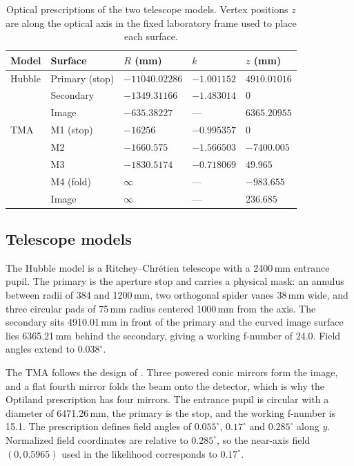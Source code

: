 \begin{table}
\centering
\caption{Optical prescriptions of the two telescope models. Vertex positions $z$ are along the optical axis in the fixed laboratory frame used to place each surface.}
\label{tab:prescriptions}
\begin{tabular}{lllll}
\hline
Model & Surface & $R$ (mm) & $k$ & $z$ (mm) \\
\hline
Hubble & Primary (stop) & $-11040.02286$ & $-1.001152$ & $4910.01016$ \\
       & Secondary      & $-1349.31166$  & $-1.483014$ & $0$ \\
       & Image          & $-635.38227$   & ---         & $6365.20955$ \\
\hline
TMA    & M1 (stop)      & $-16256$       & $-0.995357$ & $0$ \\
       & M2             & $-1660.575$    & $-1.566503$ & $-7400.005$ \\
       & M3             & $-1830.5174$   & $-0.718069$ & $49.965$ \\
       & M4 (fold)      & $\infty$       & ---         & $-983.655$ \\
       & Image          & $\infty$       & ---         & $236.685$ \\
\hline
\end{tabular}
\end{table}

\subsection{Telescope models}
The Hubble model is a Ritchey--Chr{\'e}tien telescope with a 2400\,mm entrance pupil. The primary is the aperture stop and carries a physical mask: an annulus between radii of 384 and 1200\,mm, two orthogonal spider vanes 38\,mm wide, and three circular pads of 75\,mm radius centered 1000\,mm from the axis. The secondary sits 4910.01\,mm in front of the primary and the curved image surface lies 6365.21\,mm behind the secondary, giving a working f-number of 24.0. Field angles extend to $0.038^{\circ}$.

The TMA follows the design of \citet{PearlTMA}. Three powered conic mirrors form the image, and a flat fourth mirror folds the beam onto the detector, which is why the Optiland prescription has four mirrors. The entrance pupil is circular with a diameter of 6471.26\,mm, the primary is the stop, and the working f-number is 15.1. The prescription defines field angles of $0.055^{\circ}$, $0.17^{\circ}$ and $0.285^{\circ}$ along $y$. Normalized field coordinates are relative to $0.285^{\circ}$, so the near-axis field $(0,0.5965)$ used in the likelihood corresponds to $0.17^{\circ}$.


